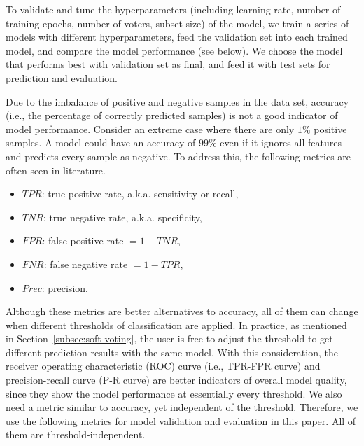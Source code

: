 \documentclass[10pt, final, letter, twocolumns]{IEEEtran}
\begin{document}
To validate and tune the hyperparameters (including learning rate, number of training epochs, number of voters, subset size) of the model, we train a series of models with different hyperparameters, feed the validation set into each trained model, and compare the model performance (see below). We choose the model that performs best with validation set as final, and feed it with test sets for prediction and evaluation.

Due to the imbalance of positive and negative samples in the data set, accuracy (i.e., the percentage of correctly predicted samples) is not a good indicator of model performance. Consider an extreme case where there are only $1\%$ positive samples. A model could have an accuracy of $99\%$ even if it ignores all features and predicts every sample as negative. To address this, the following metrics are often seen in literature.
\begin{itemize}
\item $TPR$: true positive rate, a.k.a. sensitivity or recall,
\item $TNR$: true negative rate, a.k.a. specificity,
\item $FPR$: false positive rate $=1-TNR$,
\item $FNR$: false negative rate $=1-TPR$,
\item $Prec$: precision.
\end{itemize}
Although these metrics are better alternatives to accuracy, all of them can change when different thresholds of classification are applied. In practice, as mentioned in Section~\ref{subsec:soft-voting}, the user is free to adjust the threshold to get different prediction results with the same model. With this consideration, the receiver operating characteristic (ROC) curve (i.e., TPR-FPR curve) and precision-recall curve (P-R curve) are better indicators of overall model quality, since they show the model performance at essentially every threshold. We also need a metric similar to accuracy, yet independent of the threshold.
Therefore, we use the following metrics for model validation and evaluation in this paper. All of them are threshold-independent.  
\end{document}
